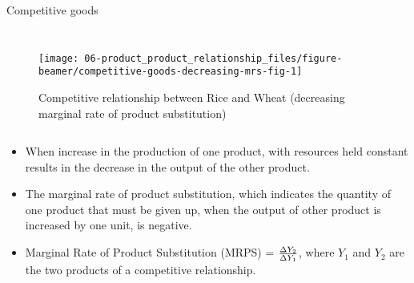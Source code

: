 \documentclass[12pt,ignorenonframetext,aspectratio=169]{beamer}
\providecommand{\tightlist}{%
  \setlength{\itemsep}{0pt}\setlength{\parskip}{0pt}}
\begin{document}
\begin{frame}{Competitive goods}
\begin{columns}
      \footnotesize

\begin{figure}

{\centering \texttt{[image: 06-product\_product\_relationship\_files/figure-beamer/competitive-goods-decreasing-mrs-fig-1]} 

}

\caption{Competitive relationship between Rice and Wheat (decreasing marginal rate of product substitution)}\label{fig:competitive-goods-decreasing-mrs-fig}
\end{figure}

\begin{table}[H]
\centering\begingroup\fontsize{5}{7}\selectfont

\endgroup{}
\end{table}


 \end{columns}
\end{frame}

\begin{frame}{}
\protect\hypertarget{section-1}{}
\footnotesize

\begin{itemize}
\tightlist
\item
  When increase in the production of one product, with resources held
  constant results in the decrease in the output of the other product.
\item
  The marginal rate of product substitution, which indicates the
  quantity of one product that must be given up, when the output of
  other product is increased by one unit, is negative.
\item
  Marginal Rate of Product Substitution (MRPS) =
  \(\large \frac{\Delta Y_2}{\Delta Y_1}\), where \(Y_1\) and \(Y_2\)
  are the two products of a competitive relationship.
\end{itemize}
\end{frame}
\end{document}
